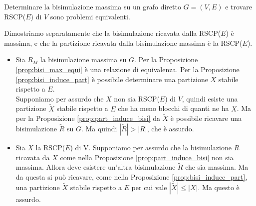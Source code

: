\begin{corollary}
    Determinare la bisimulazione massima su un grafo diretto $G = (V,E)$ e trovare RSCP($E$) di $V$ sono problemi equivalenti.
\end{corollary}
\begin{proof2}
    Dimostriamo separatamente che la bisimulazione ricavata dalla RSCP($E$) è massima, e che la partizione ricavata dalla bisimulazione massima è la RSCP($E$).
    \begin{itemize}
        \item Sia $R_M$ la bisimulazione massima su $G$. Per la Proposizione \ref{prop:bisi_max_equi} è una relazione di equivalenza. Per la Proposizione \ref{prop:bisi_induce_part} è possibile determinare una partizione $X$ stabile rispetto a $E$.\\
              Supponiamo per assurdo che $X$ non sia RSCP($E$) di $V$, quindi esiste una partizione $\widetilde{X}$ stabile rispetto a $E$ che ha meno blocchi di quanti ne ha $X$. Ma per la Proposizione \ref{prop:part_induce_bisi} da
              $\widetilde{X}$ è possibile ricavare una bisimulazione $\widetilde{R}$ su $G$. Ma quindi $|\widetilde{R}| > |R|$, che è assurdo.
        \item Sia $X$ la RSCP($E$) di V. Supponiamo per assurdo che la bisimulazione $R$ ricavata da $X$ come nella Proposizione \ref{prop:part_induce_bisi} non sia massima. Allora deve esistere un'altra bisimulazione $\widetilde{R}$ che
              sia massima. Ma da questa si può ricavare, come nella Proposizione \ref{prop:bisi_induce_part}, una partizione $\widetilde{X}$ stabile rispetto a $E$ per cui vale $|\widetilde{X}| \leq |X|$. Ma questo è assurdo.
    \end{itemize}
    \vspace*{-0.75cm}
\end{proof2}
